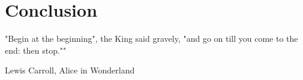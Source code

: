 \chapter{Conclusion}

\epigraph{"Begin at the beginning", the King said gravely, "and go on till you come to the end: then stop.""}{\textup{Lewis Carroll}, Alice in Wonderland}
